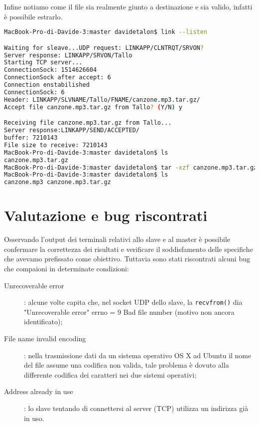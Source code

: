 \documentclass[11pt,fleqn]{book} %
\begin{document}
Infine notiamo come il file sia realmente giunto a destinazione e sia valido, infatti è possibile estrarlo.

\begin{lstlisting}[language=Bash]
MacBook-Pro-di-Davide-3:master davidetalon$ link --listen

Waiting for sleave...UDP request: LINKAPP/CLNTRQT/SRVON?
Server response: LINKAPP/SRVON/Tallo
Starting TCP server...
ConnectionSock: 1514626604
ConnectionSock after accept: 6
Connection enstabilished
ConnectionSock: 6
Header: LINKAPP/SLVNAME/Tallo/FNAME/canzone.mp3.tar.gz/
Accept file canzone.mp3.tar.gz from Tallo? (Y/N) y

Receiving file canzone.mp3.tar.gz from Tallo...
Server response:LINKAPP/SEND/ACCEPTED/
buffer: 7210143
File size to receive: 7210143
MacBook-Pro-di-Davide-3:master davidetalon$ ls
canzone.mp3.tar.gz
MacBook-Pro-di-Davide-3:master davidetalon$ tar -xzf canzone.mp3.tar.gz
MacBook-Pro-di-Davide-3:master davidetalon$ ls
canzone.mp3 canzone.mp3.tar.gz
\end{lstlisting}


\section{Valutazione e bug riscontrati}
Osservando l'output dei terminali relativi allo slave e al master è possibile confermare la correttezza dei risultati e verificare il soddisfamento delle specifiche che avevamo prefissato come obiettivo. Tuttavia sono stati riscontrati alcuni bug che compaioni in determinate condizioni:
\medskip
\begin{description}
	\item[Unrecoverable error]: alcune volte capita che, nel socket UDP dello slave, la \texttt{recvfrom()} dia "Unrecoverable error" errno = 9 Bad 		file number (motivo non ancora identificato);
	\item[File name invalid encoding]: nella trasmissione dati da un sistema operativo OS X ad Ubuntu il nome del file assume una codifica non 			valida, tale problema è dovuto alla differente codifica dei caratteri nei due sistemi operativi;
	\item[Address already in use]: lo slave tentando di connettersi al server (TCP) utilizza un indirizza già in uso. 
\end{description}




\end{document}
